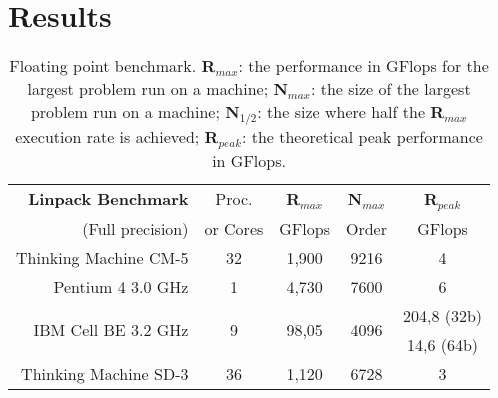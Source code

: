 \section{Results}
\blindtext

\begin{table}[!htpb]
    \caption{Floating point benchmark.
	\textbf{R$_{max}$}: the performance in GFlops for the largest problem run on a machine; \textbf{N$_{max}$}: the size of the largest problem run on a machine; \textbf{N$_{1/2}$}: the size where half the \textbf{R$_{max}$} execution rate is achieved; \textbf{R$_{peak}$}: the theoretical peak performance in GFlops.}
    \label{tab:table-01}
    \centering
    \begin{tabularx}{\linewidth}{rcccc}
        \toprule
        \textbf{Linpack	Benchmark}& Proc. & \textbf{R$_{max}$} & \textbf{N$_{max}$} & \textbf{R$_{peak}$} \\
        (Full precision) & or Cores	& GFlops & Order & GFlops \\ [0.25ex]
        \midrule
        Thinking Machine CM-5 & 32 & 1,900 & 9216 & 4 \\
        Pentium 4 3.0 GHz & 1 & 4,730 & 7600 & 6 \\
        \multirow{2}{*}{IBM Cell BE 3.2 GHz} & \multirow{2}{*}{9} & \multirow{2}{*}{98,05} & \multirow{2}{*}{4096} & 204,8 \scriptsize{(32b)} \\
        & & & & 14,6 \scriptsize{(64b)} \\
        Thinking Machine SD-3 & 36 & 1,120 & 6728 & 3 \\
        \bottomrule
    \end{tabularx}
\end{table}
